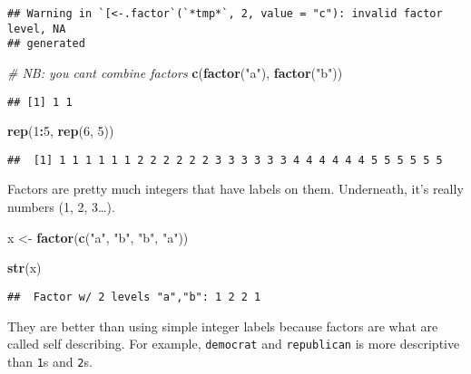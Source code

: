 \documentclass[
]{book}
\newenvironment{Shaded}{\begin{snugshade}}{\end{snugshade}}
\newcommand{\CommentTok}[1]{\textcolor[rgb]{0.56,0.35,0.01}{\textit{#1}}}
\newcommand{\DecValTok}[1]{\textcolor[rgb]{0.00,0.00,0.81}{#1}}
\newcommand{\KeywordTok}[1]{\textcolor[rgb]{0.13,0.29,0.53}{\textbf{#1}}}
\newcommand{\NormalTok}[1]{#1}
\newcommand{\OperatorTok}[1]{\textcolor[rgb]{0.81,0.36,0.00}{\textbf{#1}}}
\newcommand{\StringTok}[1]{\textcolor[rgb]{0.31,0.60,0.02}{#1}}
\begin{document}
\begin{verbatim}
## Warning in `[<-.factor`(`*tmp*`, 2, value = "c"): invalid factor level, NA
## generated
\end{verbatim}

\begin{Shaded}
\begin{Highlighting}[]
\CommentTok{\# NB: you can\textquotesingle{}t combine factors}
\KeywordTok{c}\NormalTok{(}\KeywordTok{factor}\NormalTok{(}\StringTok{"a"}\NormalTok{), }\KeywordTok{factor}\NormalTok{(}\StringTok{"b"}\NormalTok{))}
\end{Highlighting}
\end{Shaded}

\begin{verbatim}
## [1] 1 1
\end{verbatim}

\begin{Shaded}
\begin{Highlighting}[]
\KeywordTok{rep}\NormalTok{(}\DecValTok{1}\OperatorTok{:}\DecValTok{5}\NormalTok{, }\KeywordTok{rep}\NormalTok{(}\DecValTok{6}\NormalTok{, }\DecValTok{5}\NormalTok{))}
\end{Highlighting}
\end{Shaded}

\begin{verbatim}
##  [1] 1 1 1 1 1 1 2 2 2 2 2 2 3 3 3 3 3 3 4 4 4 4 4 4 5 5 5 5 5 5
\end{verbatim}

Factors are pretty much integers that have labels on them. Underneath, it's really numbers (1, 2, 3\ldots).

\begin{Shaded}
\begin{Highlighting}[]
\NormalTok{x \textless{}{-}}\StringTok{ }\KeywordTok{factor}\NormalTok{(}\KeywordTok{c}\NormalTok{(}\StringTok{"a"}\NormalTok{, }\StringTok{"b"}\NormalTok{, }\StringTok{"b"}\NormalTok{, }\StringTok{"a"}\NormalTok{))}

\KeywordTok{str}\NormalTok{(x)}
\end{Highlighting}
\end{Shaded}

\begin{verbatim}
##  Factor w/ 2 levels "a","b": 1 2 2 1
\end{verbatim}

They are better than using simple integer labels because factors are what are called self describing. For example, \texttt{democrat} and \texttt{republican} is more descriptive than \texttt{1}s and \texttt{2}s.
\end{document}
